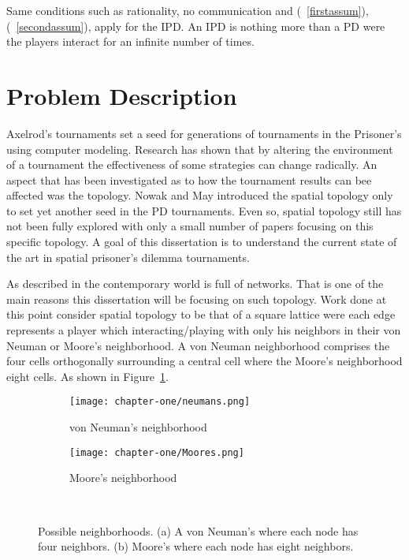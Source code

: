 Same conditions such as rationality, no communication and (~\ref{firstassum}),
(~\ref{secondassum}),
apply for the IPD. An IPD is nothing more than a PD were
the players interact for an infinite number of times.

\section{Problem Description}

Axelrod's tournaments set a seed for generations of tournaments in the
Prisoner's using computer modeling. Research has shown that by altering the
environment of a tournament the effectiveness of some strategies can change
radically. An aspect that has been investigated as to how the tournament results
can bee affected was the topology. Nowak and May \cite{Nowak1992} introduced the spatial topology
only to set yet another seed in the PD tournaments. Even so, spatial topology
still has not been fully explored with only a small number of papers focusing on
this specific topology.  A goal of this dissertation is to understand the
current state of the art in spatial prisoner’s dilemma tournaments.

As described in \cite{Maschler} the contemporary world is full of networks. That
is one of the main reasons this dissertation will be focusing on such topology.
Work done at this point consider spatial topology to be that of a square lattice
were each edge represents a player which interacting/playing with only his
neighbors in their von Neuman or Moore's neighborhood. A von Neuman neighborhood
comprises the four cells orthogonally surrounding a central cell where the
Moore's neighborhood eight cells. As shown in Figure~\ref{fig:neighborhood}.

\begin{figure}[h]
\centering
    \begin{subfigure}[t]{0.40\textwidth}
    \centering
        \texttt{[image: chapter-one/neumans.png]}
    \caption{von Neuman's neighborhood}
    \end{subfigure}
\hfill
    \begin{subfigure}[t]{0.40\textwidth}\centering
    \centering
        \texttt{[image: chapter-one/Moores.png]}
    \caption{Moore's neighborhood}
    \end{subfigure}
~
\caption{Possible neighborhoods. (a) A von Neuman's where each node has four neighbors.
(b) Moore's where each node has eight neighbors.}
\label{fig:neighborhood}
\end{figure}

